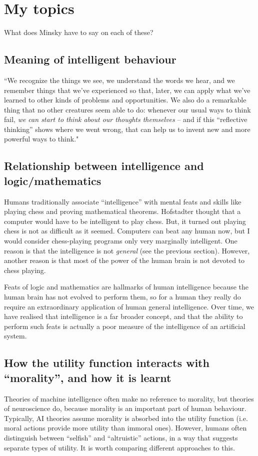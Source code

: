 \documentclass[10pt,a4paper]{article}
\newcommand{\nquote}[1]{``{#1}''}
\begin{document}
\section{My topics}
What does Minsky have to say on each of these?

\subsection{Meaning of intelligent behaviour}
``We recognize the things we see, we understand the
words we hear, and we remember things that we've experienced so that, later, we can apply what we've learned to other kinds of problems and opportunities. We also do a remarkable thing that no other creatures seem able to do: whenever our usual ways to think fail, \emph{we can start to think about our thoughts themselves} -- and if this \nquote{reflective thinking} shows where we went wrong, that can help us to invent new and more powerful ways to
think." \cite[p.~1]{minsky}

\subsection{Relationship between intelligence and logic/mathematics}
Humans traditionally associate \nquote{intelligence} with mental feats and skills like playing chess and proving mathematical theorems. Hofstadter \cite{hofstadter} thought that a computer would have to be intelligent to play chess. But, it turned out playing chess is not as difficult as it seemed. Computers can beat any human now, but I would consider chess-playing programs only very marginally intelligent. One reason is that the intelligence is not \emph{general} (see the previous section). However, another reason is that most of the power of the human brain is not devoted to chess playing.

Feats of logic and mathematics are hallmarks of human intelligence because the human brain has not evolved to perform them, so for a human they really do require an extraordinary application of human general intelligence. Over time, we have realised that intelligence is a far broader concept, and that the ability to perform such feats is actually a poor measure of the intelligence of an artificial system.

\subsection{How the utility function interacts with \nquote{morality}, and how it is learnt}
Theories of machine intelligence often make no reference to morality, but theories of neuroscience do, because morality is an important part of human behaviour. Typically, AI theories assume morality is absorbed into the utility function (i.e. moral actions provide more utility than immoral ones). However, humans often distinguish between \nquote{selfish} and \nquote{altruistic} actions, in a way that suggests separate types of utility. It is worth comparing different approaches to this.
\end{document}
